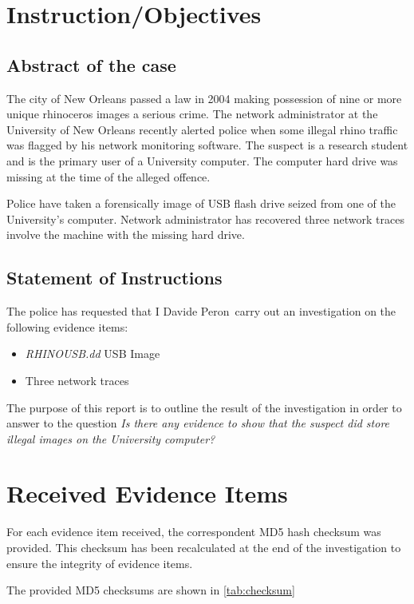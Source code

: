 \documentclass{article}
\newcommand{\writer}{Davide Peron}
\begin{document}
\section{Instruction/Objectives}

\subsection{Abstract of the case}

The city of New Orleans passed a law in 2004 making possession of nine or more unique rhinoceros images a serious crime. The network  administrator at the University of New Orleans recently alerted police when some illegal rhino traffic was flagged by his network monitoring software. The suspect is a research student and is the primary user of a University computer. The computer hard drive was missing at the time of the alleged offence.

Police have taken a forensically image of USB flash drive seized from one of the University's computer.
Network administrator has recovered three network traces involve the machine with the missing hard drive.

\subsection{Statement of Instructions}
The police has requested that I \writer ~carry out an investigation on the following evidence items:

\begin{itemize}
	\item \textit{RHINOUSB.dd} USB Image
	\item Three network traces
\end{itemize}

The purpose of this report is to outline the result of the investigation in order to answer to the question \textit{Is there any evidence to show that the suspect did store illegal images on the University computer?}

\section{Received Evidence Items}

For each evidence item received, the correspondent MD5 hash checksum was provided.
This checksum has been recalculated at the end of the investigation to ensure the integrity of evidence items.

The provided MD5 checksums are shown in \autoref{tab:checksum}
\end{document}

